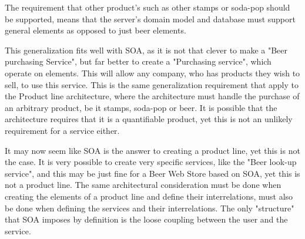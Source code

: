 The requirement that other product's such as other stamps or soda-pop should be supported, means that the server's domain model and database must support general elements as opposed to just beer elements.

This generalization fits well with SOA, as it is not that clever to make a "Beer purchasing Service", but far better to create a "Purchasing service", which operate on elements. This will allow any company, who has products they wish to sell, to use this service. This is the same generalization requirement that apply to the Product line architecture, where the architecture must handle the purchase of an arbitrary product, be it stamps, soda-pop or beer. It is possible that the architecture requires that it is a quantifiable product, yet this is not an unlikely requirement for a service either.

It may now seem like SOA is the answer to creating a product line, yet this is not the case. It is very possible to create very specific services, like the "Beer look-up service", and this may be just fine for a Beer Web Store based on SOA, yet this is not a product line. The same architectural consideration must be done when creating the elements of a product line and define their interrelations, must also be done when defining the services and their interrelations. The only "structure" that SOA imposes by definition is the loose coupling between the user and the service.
